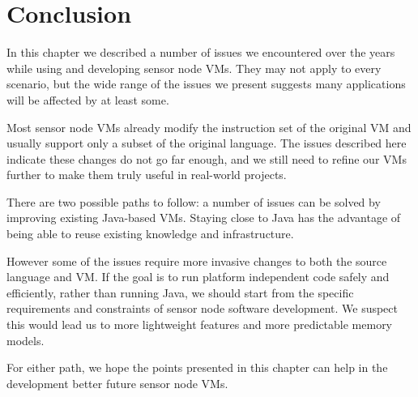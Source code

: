 \section{Conclusion}
In this chapter we described a number of issues we encountered over the years while using and developing sensor node VMs. They may not apply to every scenario, but the wide range of the issues we present suggests many applications will be affected by at least some.

Most sensor node VMs already modify the instruction set of the original VM and usually support only a subset of the original language. The issues described here indicate these changes do not go far enough, and we still need to refine our VMs further to make them truly useful in real-world projects.

There are two possible paths to follow: a number of issues can be solved by improving existing Java-based VMs. Staying close to Java has the advantage of being able to reuse existing knowledge and infrastructure.

However some of the issues require more invasive changes to both the source language and VM. If the goal is to run platform independent code safely and efficiently, rather than running Java, we should start from the specific requirements and constraints of sensor node software development. We suspect this would lead us to more lightweight features and more predictable memory models.

For either path, we hope the points presented in this chapter can help in the development better future sensor node VMs.

